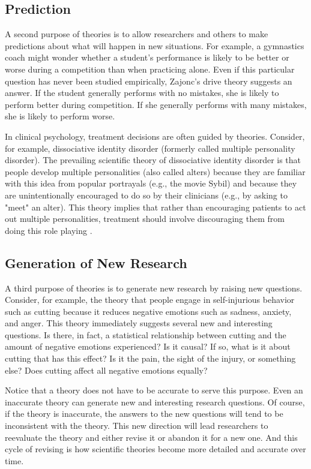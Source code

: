 \subsection{Prediction}


A second purpose of theories is to allow researchers and others to make predictions about what will happen in new situations. For example, a gymnastics coach might wonder whether a student's performance is likely to be better or worse during a competition than when practicing alone. Even if this particular question has never been studied empirically, Zajonc's drive theory suggests an answer. If the student generally performs with no mistakes, she is likely to perform better during competition. If she generally performs with many mistakes, she is likely to perform worse.


In clinical psychology, treatment decisions are often guided by theories. Consider, for example, dissociative identity disorder (formerly called multiple personality disorder). The prevailing scientific theory of dissociative identity disorder is that people develop multiple personalities (also called alters) because they are familiar with this idea from popular portrayals (e.g., the movie Sybil) and because they are unintentionally encouraged to do so by their clinicians (e.g., by asking to "meet" an alter). This theory implies that rather than encouraging patients to act out multiple personalities, treatment should involve discouraging them from doing this role playing \citep{lilienfeld_50_2011}.


\subsection{Generation of New Research}

A third purpose of theories is to generate new research by raising new questions. Consider, for example, the theory that people engage in self-injurious behavior such as cutting because it reduces negative emotions such as sadness, anxiety, and anger. This theory immediately suggests several new and interesting questions. Is there, in fact, a statistical relationship between cutting and the amount of negative emotions experienced? Is it causal? If so, what is it about cutting that has this effect? Is it the pain, the sight of the injury, or something else? Does cutting affect all negative emotions equally?

Notice that a theory does not have to be accurate to serve this purpose. Even an inaccurate theory can generate new and interesting research questions. Of course, if the theory is inaccurate, the answers to the new questions will tend to be inconsistent with the theory. This new direction will lead researchers to reevaluate the theory and either revise it or abandon it for a new one. And this cycle of revising is how scientific theories become more detailed and accurate over time.

